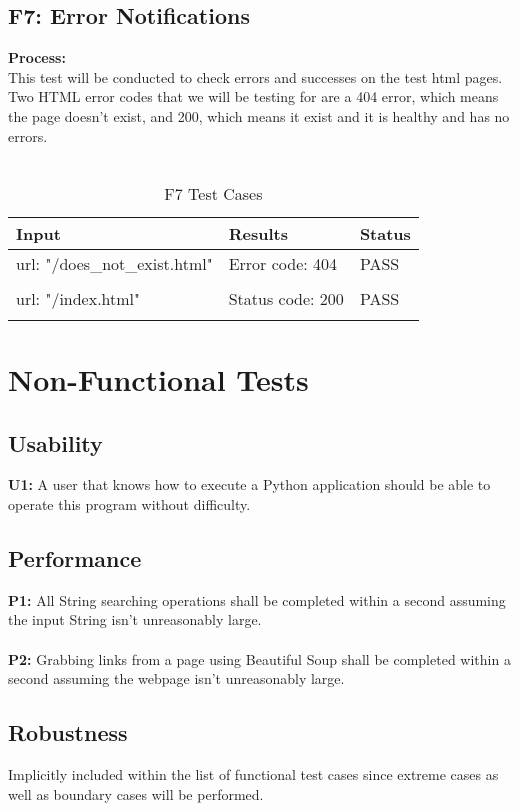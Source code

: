 \documentclass[12pt, titlepage]{article}
\begin{document}
\pagebreak

\subsection{F7: Error Notifications}
\textbf{Process:}\\
This test will be conducted to check errors and successes on the test html pages. Two HTML error codes that we will be testing for are a 404 error, which means the page doesn't exist, and 200, which means it exist and it is healthy and has no errors. \\\
\begin{table}[h!]
\centering
\begin{tabular}{ p{7cm}  p{4cm}  p{4cm} }
	Input &Results & Status\\ \hline
	url: "/does\_not\_exist.html" & Error code: 404  & PASS\\\\ \hline
	url: "/index.html" & Status code: 200 & PASS\\\\ \hline
\end{tabular}
\caption{F7 Test Cases}
\label{table:F7 Test Cases}
\end{table}

\section{Non-Functional Tests}
\subsection{Usability}
\textbf{U1:} A user that knows how to execute a Python application should be able to operate this program without difficulty.

\subsection{Performance}
\textbf{P1:} All String searching operations shall be completed within a second assuming the input String isn't unreasonably large.\\\\
\textbf{P2:} Grabbing links from a page using Beautiful Soup shall be completed within a second assuming the webpage isn't unreasonably large.
\subsection{Robustness}
Implicitly included within the list of functional test cases since extreme cases as well as boundary cases will be performed.\\\\
\end{document}
